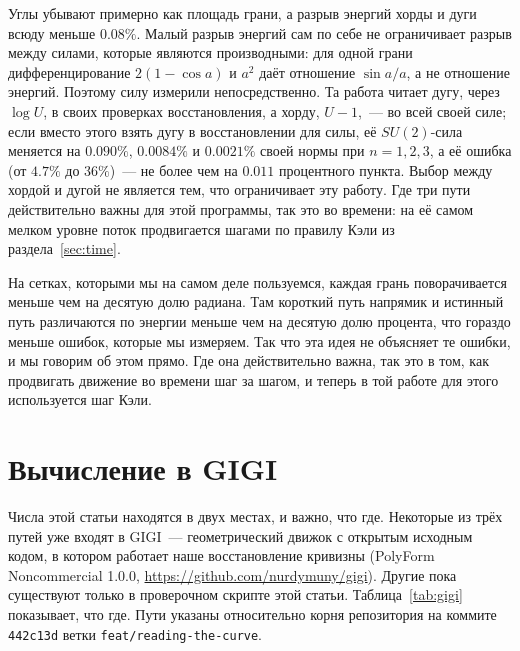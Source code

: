 Углы убывают примерно как площадь грани, а разрыв энергий хорды и дуги всюду меньше
$0.08\%$. Малый разрыв энергий сам по себе не ограничивает разрыв между силами, которые
являются производными: для одной грани дифференцирование $2(1-\cos a)$ и $a^2$ даёт отношение
$\sin a/a$, а не отношение энергий. Поэтому силу измерили непосредственно. Та работа читает дугу,
через $\log U$, в своих проверках восстановления, а хорду, $U-1$,~--- во всей своей силе; если вместо этого
взять дугу в восстановлении для силы, её $SU(2)$-сила меняется на $0.090\%$, $0.0084\%$ и
$0.0021\%$ своей нормы при $n=1,2,3$, а её ошибка (от $4.7\%$ до $36\%$)~--- не более чем на
$0.011$ процентного пункта. Выбор между хордой и дугой не является тем, что ограничивает эту работу. Где три пути действительно важны для этой
программы, так это во времени: на её самом мелком уровне поток продвигается шагами по правилу Кэли из
раздела~\ref{sec:time}.

\begin{plain}
На сетках, которыми мы на самом деле пользуемся, каждая грань поворачивается меньше чем на десятую
долю радиана. Там короткий путь напрямик и истинный путь различаются по энергии меньше чем на
десятую долю процента, что гораздо меньше ошибок, которые мы измеряем. Так что эта идея не
объясняет те ошибки, и мы говорим об этом прямо. Где она действительно важна, так это в том, как
продвигать движение во времени шаг за шагом, и теперь в той работе для этого используется шаг Кэли.
\end{plain}

\section{Вычисление в GIGI}\label{sec:gigi}

Числа этой статьи находятся в двух местах, и важно, что где. Некоторые из
трёх путей уже входят в GIGI~--- геометрический движок с открытым исходным кодом, в котором
работает наше восстановление кривизны (PolyForm Noncommercial 1.0.0,
\url{https://github.com/nurdymuny/gigi}). Другие пока существуют только в проверочном
скрипте этой статьи. Таблица~\ref{tab:gigi} показывает, что где. Пути указаны относительно корня
репозитория на коммите \texttt{442c13d} ветки \texttt{feat/reading-the-curve}.


